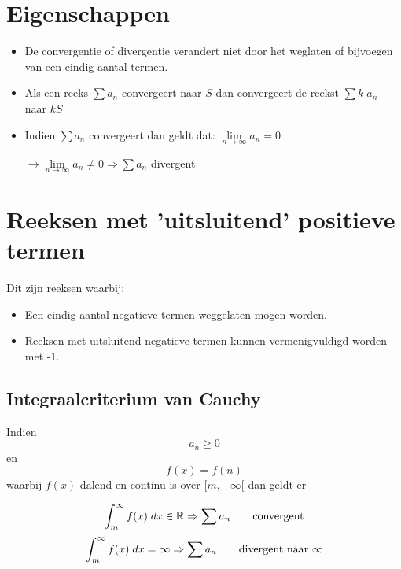 \section{Eigenschappen}
\begin{itemize}
	\item De convergentie of divergentie verandert niet door het weglaten of bijvoegen van een eindig aantal termen.
	\item Als een reeks $\sum a_n$ convergeert naar $S$ dan convergeert de reekst $\sum k\;a_n$ naar $kS$
	\item Indien $\sum a_n$ convergeert dan geldt dat: $\lim\limits_{n\to\infty} a_n = 0$

	      $\rightarrow \lim\limits_{n\to\infty} a_n \neq 0 \Rightarrow \sum a_n $ divergent
\end{itemize}

\section{Reeksen met 'uitsluitend' positieve termen}
Dit zijn reeksen waarbij:
\begin{itemize}
	\item Een eindig aantal negatieve termen weggelaten mogen worden.
	\item Reeksen met uitsluitend negatieve termen kunnen vermenigvuldigd worden met -1.
\end{itemize}
\subsection{Integraalcriterium van Cauchy}
Indien $$a_n \geq 0$$
en $$f(x) = f(n)$$ waarbij $f(x)$ dalend en continu is over $[m, +\infty[$
dan geldt er

$$\int_m^\infty f(x)\;dx \in \mathbb{R} \Rightarrow \sum a_n \qquad \hbox{convergent}$$
$$\int_m^\infty f(x)\;dx = \infty \Rightarrow \sum a_n \qquad \hbox{divergent naar } \infty$$

